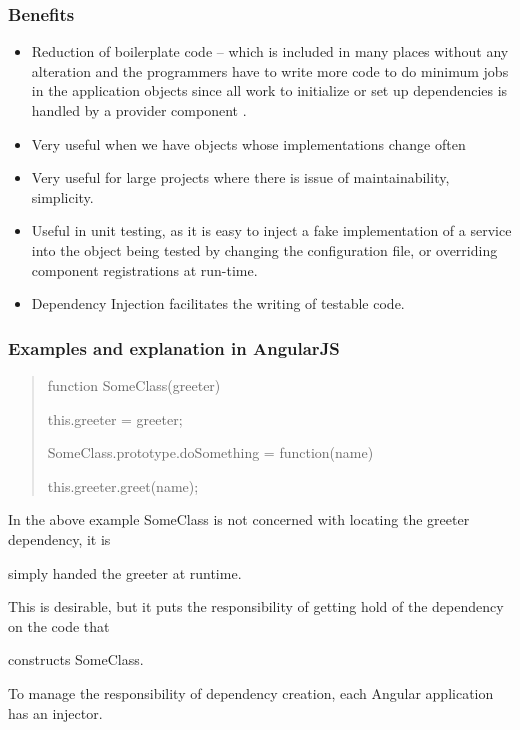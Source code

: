 \documentclass[14pt,a4paper]{extreport}
\begin{document}
		\subsubsection{Benefits}
\begin{itemize}
\item Reduction of boilerplate code – which is included in many places without any alteration and the programmers have to write more code to do minimum jobs in the application objects since all work to initialize or set up dependencies is handled by a provider component . 
\item Very useful when we have objects whose implementations change often 
\item Very useful for large projects where there is issue of maintainability, simplicity.

\item Useful in unit testing, as it is easy to inject a fake implementation of a service into the object being tested by changing the configuration file, or overriding component registrations at run-time.

\item Dependency Injection facilitates the writing of testable code.
\end{itemize}
			\subsubsection{Examples and explanation in AngularJS}
			\begin{verse}
			function SomeClass(greeter) {

this.greeter = greeter;

}

 SomeClass.prototype.doSomething = function(name) {

this.greeter.greet(name);

}
\end{verse}
In the above example SomeClass is not concerned with locating the greeter dependency, it is 

simply handed the greeter at runtime.

This is desirable, but it puts the responsibility of getting hold of the dependency on the code that 

constructs SomeClass.

To manage the responsibility of dependency creation, each Angular application has an injector. 
\end{document}
